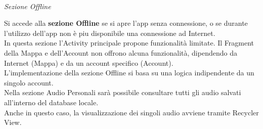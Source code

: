\documentclass{article}
\begin{document}
\quad \vspace*{10pt}\\
\textit{Sezione Offline}\\
\begin{minipage}[t]{0.6\textwidth}
    \raggedright
    \vspace*{10pt}
    Si accede alla \textbf{sezione Offline} se si apre l'app senza connessione, o se durante l'utilizzo dell'app non è piu disponibile una connessione ad Internet.\\
    In questa sezione l'Activity principale propone funzionalità limitate. Il Fragment della Mappa e dell'Account non offrono alcuna funzionalità, dipendendo da Internet (Mappa) e da un account specifico (Account).\\
    L'implementazione della sezione Offline si basa su una logica indipendente da un singolo account.\vspace*{14pt}\\
    Nella sezione Audio Personali sarà possibile consultare tutti gli audio salvati all'interno del database locale.\\
    Anche in questo caso, la visualizzazione dei singoli audio avviene tramite Recycler View.
\end{minipage}
\hfill
\end{document}

